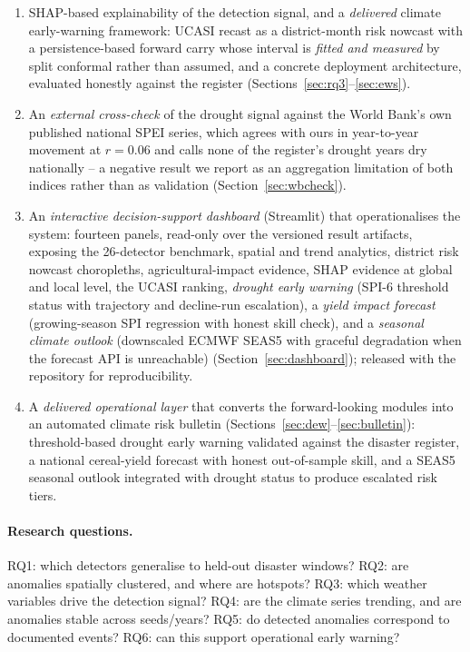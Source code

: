 \documentclass[preprint,12pt]{elsarticle}
\begin{document}
\begin{enumerate}
score with severity bands (Section~\ref{sec:ucasi}).
\item SHAP-based explainability of the detection signal, and a \emph{delivered}
climate early-warning framework: UCASI recast as a district-month risk nowcast
with a persistence-based forward carry whose interval is \emph{fitted and
measured} by split conformal rather than assumed, and a concrete deployment
architecture, evaluated honestly against the register
(Sections~\ref{sec:rq3}--\ref{sec:ews}).
\item An \emph{external cross-check} of the drought signal against the World
Bank's own published national SPEI series, which agrees with ours in
year-to-year movement at $r=0.06$ and calls none of the register's drought
years dry nationally -- a negative result we report as an aggregation
limitation of both indices rather than as validation (Section~\ref{sec:wbcheck}).
\item An \emph{interactive decision-support dashboard} (Streamlit) that
operationalises the system: fourteen panels, read-only over the versioned result
artifacts, exposing the 26-detector benchmark, spatial and trend analytics,
district risk nowcast choropleths, agricultural-impact evidence, SHAP
evidence at global and local level, the UCASI ranking,
\emph{drought early warning} (SPI-6 threshold status with trajectory and
decline-run escalation), a \emph{yield impact forecast} (growing-season SPI
regression with honest skill check), and a \emph{seasonal climate outlook}
(downscaled ECMWF SEAS5 with graceful degradation when the forecast API is
unreachable) (Section~\ref{sec:dashboard}); released with the repository for
reproducibility.
\item A \emph{delivered operational layer} that converts the forward-looking
modules into an automated climate risk bulletin
(Sections~\ref{sec:dew}--\ref{sec:bulletin}): threshold-based drought early
warning validated against the disaster register, a national cereal-yield
forecast with honest out-of-sample skill, and a SEAS5 seasonal outlook
integrated with drought status to produce escalated risk tiers.
\end{enumerate}

\paragraph{Research questions.}
RQ1: which detectors generalise to held-out disaster windows?
RQ2: are anomalies spatially clustered, and where are hotspots?
RQ3: which weather variables drive the detection signal?
RQ4: are the climate series trending, and are anomalies stable across seeds/years?
RQ5: do detected anomalies correspond to documented events?
RQ6: can this support operational early warning?
\end{document}
